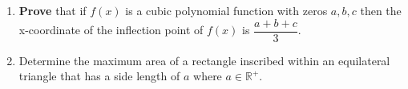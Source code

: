 \documentclass[12pt]{book}
\begin{document}
\begin{enumerate}
\newpage

\item \textbf{Prove} that if $f(x)$ is a cubic polynomial function with zeros $a,b,c$ then the x-coordinate of the inflection point of $f(x)$ is $\dfrac{a+b+c}{3}$.

\newpage


\item Determine the maximum area of a rectangle inscribed within an equilateral triangle that has a side length of $a$ where $a \in \mathbb{R^+}$. 

\vspace{1cm}



\newpage



\end{enumerate}
\end{document}
